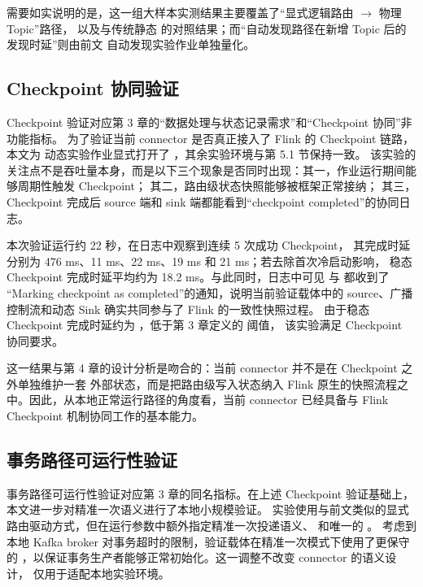 需要如实说明的是，这一组大样本实测结果主要覆盖了“显式逻辑路由 $\rightarrow$ 物理 Topic”路径，
以及与传统静态  的对照结果；而“自动发现路径在新增 Topic 后的发现时延”则由前文
自动发现实验作业单独量化。

\subsection{Checkpoint 协同验证}

Checkpoint 验证对应第 3 章的“数据处理与状态记录需求”和“Checkpoint 协同”非功能指标。
为了验证当前 connector 是否真正接入了 Flink 的 Checkpoint 链路，本文为
动态实验作业显式打开了 ，其余实验环境与第 5.1 节保持一致。
该实验的关注点不是吞吐量本身，而是以下三个现象是否同时出现：其一，作业运行期间能够周期性触发 Checkpoint；
其二，路由级状态快照能够被框架正常接纳；
其三，Checkpoint 完成后 source 端和 sink 端都能看到“checkpoint completed”的协同日志。

本次验证运行约 22 秒，在日志中观察到连续 5 次成功 Checkpoint，
其完成时延分别为 476 ms、11 ms、22 ms、19 ms 和 21 ms；若去除首次冷启动影响，
稳态 Checkpoint 完成时延平均约为 18.2 ms。与此同时，日志中可见
 与  都收到了
“Marking checkpoint as completed”的通知，说明当前验证载体中的 source、广播控制流和动态 Sink
确实共同参与了 Flink 的一致性快照过程。
由于稳态 Checkpoint 完成时延约为 ，低于第 3 章定义的  阈值，
该实验满足 Checkpoint 协同要求。

这一结果与第 4 章的设计分析是吻合的：当前 connector 并不是在 Checkpoint 之外单独维护一套
外部状态，而是把路由级写入状态纳入
Flink 原生的快照流程之中。因此，从本地正常运行路径的角度看，当前 connector 已经具备与
Flink Checkpoint 机制协同工作的基本能力。

\subsection{事务路径可运行性验证}

事务路径可运行性验证对应第 3 章的同名指标。在上述 Checkpoint 验证基础上，
本文进一步对精准一次语义进行了本地小规模验证。
实验使用与前文类似的显式路由驱动方式，但在运行参数中额外指定精准一次投递语义、
 和唯一的 。
考虑到本地 Kafka broker 对事务超时的限制，验证载体在精准一次模式下使用了更保守的
，以保证事务生产者能够正常初始化。这一调整不改变 connector 的语义设计，
仅用于适配本地实验环境。

